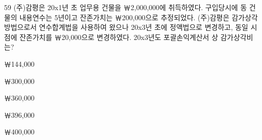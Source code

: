 \begin{question}{59}
(주)감평은 20x1년 초 업무용 건물을 ￦2,000,000에 취득하였다. 구입당시에 동 건물의 내용연수는 5년이고 잔존가치는 ￦200,000으로 추정되었다. (주)감평은 감가상각방법으로서 연수합계법을 사용하여 왔으나 20x3년 초에 정액법으로 변경하고, 동일 시점에 잔존가치를 ￦20,000으로 변경하였다. 20x3년도 포괄손익계산서 상 감가상각비는?
\begin{choices}
  \item ￦144,000
  \item ￦300,000
  \item ￦360,000
  \item ￦396,000
  \item ￦400,000
\end{choices}
\end{question}
